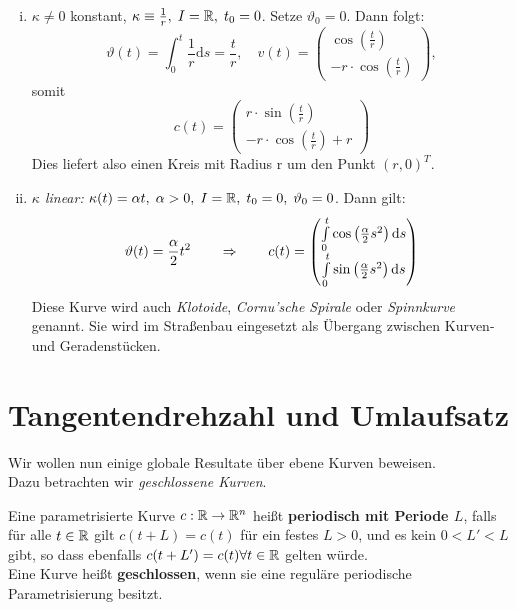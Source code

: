 \documentclass[11pt]{scrbook}
\begin{document}
\begin{ex}
\begin{enumerate}[i)]
	\item
	 $\kappa \neq 0$ konstant, $\kappa \equiv \frac{1}{r}, \; I = \mathbb{R}, \; t_0 = 0$. Setze $\vartheta_0 = 0$. Dann folgt:
	 \[
	 \vartheta(t)=\int_0^t \frac{1}{r} \mathrm d s= \frac{t}{r}, \quad v(t)=\begin{pmatrix} \cos\left (\frac{t}{r}\right ) \\ -r \cdot \cos\left ( \frac t r \right ) \end{pmatrix},
	 \]
	 somit 
	 \[
	 c(t)=\begin{pmatrix} r \cdot \sin\left ( \frac t r \right ) \\ -r \cdot \cos \left ( \frac t r \right ) +r \end{pmatrix}
	 \]
	 Dies liefert also einen Kreis mit Radius r um den Punkt $(r,0)^T$.
	 
	 \item \emph{ $\kappa$ linear:} $\kappa (t) = \alpha t, \; \alpha > 0, \; I = \mathbb{R}, \; t_0 = 0, \; \vartheta_0 = 0$. Dann gilt: 
	 \[ \vartheta(t) = \frac{\alpha}{2} t^2 \qquad \Rightarrow \qquad c(t) = \begin{pmatrix} \int\limits_0^t \cos \left (\frac{\alpha}{2} s^2 \right ) \mathrm d s \\ \int\limits_0^t \sin \left (\frac{\alpha}{2} s^2 \right ) \mathrm d s \end{pmatrix}
	 \]
	 Diese Kurve wird auch \emph{Klotoide}, \emph{Cornu'sche Spirale} oder \emph{Spinnkurve} genannt. Sie wird im Straßenbau eingesetzt als Übergang zwischen Kurven- und Geradenstücken.  
\end{enumerate}
\end{ex}

\section{Tangentendrehzahl und Umlaufsatz}
Wir wollen nun einige globale Resultate über ebene Kurven beweisen. \\
Dazu betrachten wir \emph{geschlossene Kurven}. \\
\fixme[Bilder]

\begin{df}
Eine parametrisierte Kurve $c: \mathbb{R} \to \mathbb{R}^n$ heißt \textbf{periodisch mit Periode $L$}, falls für alle $t \in \mathbb{R}$ gilt $c(t+L) = c(t)$ für ein festes $L > 0$, und es kein $ 0 < L' < L$ gibt, so dass ebenfalls $c(t+L') = c(t) \forall t \in \mathbb{R}$ gelten würde. \\
Eine Kurve heißt \textbf{geschlossen}, wenn sie eine reguläre periodische Parametrisierung besitzt.
\end{df}
\end{document}
